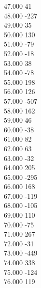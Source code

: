{ 47.000	41 \\
 48.000	-227 \\
 49.000	35 \\
 50.000	130 \\
 51.000	-79 \\
 52.000	-18 \\
 53.000	38 \\
 54.000	-78 \\
 55.000	198 \\
 56.000	126 \\
 57.000	-507 \\
 58.000	162 \\
 59.000	46 \\
 60.000	-38 \\
 61.000	82 \\
 62.000	63 \\
 63.000	-32 \\
 64.000	205 \\
 65.000	-295 \\
 66.000	168 \\
 67.000	-119 \\
 68.000	-105 \\
 69.000	110 \\
 70.000	-75 \\
 71.000	267 \\
 72.000	-31 \\
 73.000	-449 \\
 74.000	338 \\
 75.000	-124 \\
 76.000	119 \\
}
